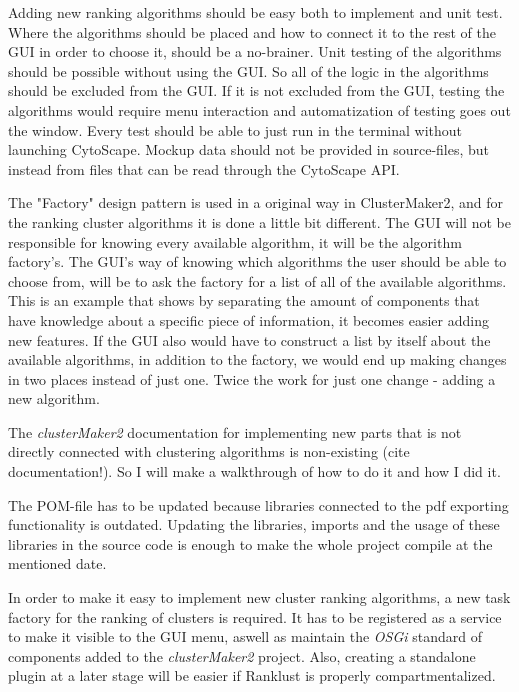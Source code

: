 \documentclass[UKenglish]{ifimaster}
\begin{document}
Adding new ranking algorithms should be easy both to implement and unit test. Where the algorithms should be placed and
how to connect it to the rest of the GUI in order to choose it, should be a no-brainer. Unit testing of the algorithms
should be possible without using the GUI. So all of the logic in the algorithms should be excluded from the GUI. If it
is not excluded from the GUI, testing the algorithms would require menu interaction and automatization of testing goes
out the window. Every test should be able to just run in the terminal without launching CytoScape. Mockup data %
should not be provided in source-files, but instead from files that can be read through the CytoScape API. %

The "Factory" design pattern %
is used in a original way in ClusterMaker2, and for the ranking cluster algorithms it is done a little bit different.
The GUI will not be responsible for knowing every available algorithm, it will be the algorithm factory's. The GUI's way
of knowing which algorithms the user should be able to choose from, will be to ask the factory for a list of all of the
available algorithms. This is an example that shows by separating the amount of components that have knowledge about a
specific piece of information, it becomes easier adding new features. If the GUI also would have to construct a list by
itself about the available algorithms, in addition to the factory, we would end up making changes in two places instead
of just one. Twice the work for just one change - adding a new algorithm.


The \textit{clusterMaker2} documentation for implementing new parts that is not directly connected with clustering
algorithms is non-existing (cite documentation!). So I will make a walkthrough of how to do it and how I did it.


The POM-file has to be updated because libraries connected to the pdf exporting functionality is outdated. Updating the
libraries, imports and the usage of these libraries in the source code is enough to make the whole project compile at
the mentioned date.

In order to make it easy to implement new cluster ranking algorithms, a new task factory for the ranking of clusters is
required. It has to be registered as a service to make it visible to the GUI menu, aswell as maintain the \textit{OSGi}
standard of components added to the \textit{clusterMaker2} project. Also, creating a standalone plugin at a later stage will
be easier if Ranklust is properly compartmentalized.
\end{document}
